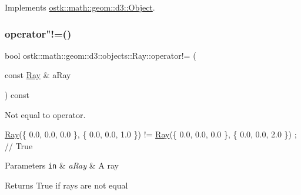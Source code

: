 Implements \hyperlink{classostk_1_1math_1_1geom_1_1d3_1_1_object_a271a1964cd208be85ce9a0a429395ad8}{ostk\+::math\+::geom\+::d3\+::\+Object}.

\mbox{\label{classostk_1_1math_1_1geom_1_1d3_1_1objects_1_1_ray_a9167ca5a0a3ad5a8c5e156231838aef3}} 
\subsubsection{\texorpdfstring{operator"!=()}{operator!=()}}
{\footnotesize\ttfamily bool ostk\+::math\+::geom\+::d3\+::objects\+::\+Ray\+::operator!= (\begin{DoxyParamCaption}\item[{const \hyperlink{classostk_1_1math_1_1geom_1_1d3_1_1objects_1_1_ray}{Ray} \&}]{a\+Ray }\end{DoxyParamCaption}) const}



Not equal to operator. 


\begin{DoxyCode}
\hyperlink{classostk_1_1math_1_1geom_1_1d3_1_1objects_1_1_ray_a78335698f8a4f72e613e607b13121df0}{Ray}(\{ 0.0, 0.0, 0.0 \}, \{ 0.0, 0.0, 1.0 \}) != \hyperlink{classostk_1_1math_1_1geom_1_1d3_1_1objects_1_1_ray_a78335698f8a4f72e613e607b13121df0}{Ray}(\{ 0.0, 0.0, 0.0 \}, \{ 0.0, 0.0, 2.0 \}) ; \textcolor{comment}{// True}
\end{DoxyCode}



\begin{DoxyParams}[1]{Parameters}
\mbox{\tt in}  & {\em a\+Ray} & A ray \\
\hline
\end{DoxyParams}
\begin{DoxyReturn}{Returns}
True if rays are not equal 
\end{DoxyReturn}
\mbox{\label{classostk_1_1math_1_1geom_1_1d3_1_1objects_1_1_ray_ad261573a0f3538dae39cd28c7d9a7dd2}} 
